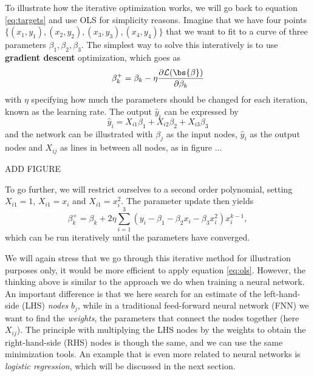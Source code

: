 To illustrate how the iterative optimization works, we will go back to equation \eqref{eq:targets} and use OLS for simplicity reasons. Imagine that we have four points $\{(x_1,y_1),(x_2,y_2),(x_3,y_3),(x_4,y_4)\}$ that we want to fit to a curve of three parameters $\beta_1,\beta_2,\beta_3$. The simplest way to solve this interatively is to use \textbf{gradient descent} optimization, which goes as
\begin{equation}
\beta_k^+=\beta_k-\eta \frac{\partial\mathcal{L}(\bs{\beta})}{\partial\beta_k}
\end{equation}
with $\eta$ specifying how much the parameters should be changed for each iteration, known as the learning rate. 
The output $\hat{y}_i$ can be expressed by
\begin{equation}
\hat{y}_i=X_{i1}\beta_1+X_{i2}\beta_2+X_{i3}\beta_3
\end{equation}
and the network can be illustrated with $\beta_j$ as the input nodes, $\hat{y}_i$ as the output nodes and $X_{ij}$ as lines in between all nodes, as in figure ... 

ADD FIGURE

To go further, we will restrict  ourselves to a second order polynomial, setting $X_{i1}=1$, $X_{i1}=x_i$ and $X_{i1}=x_i^2$. The parameter update then yields
\begin{equation}
\beta_k^+=\beta_k+2\eta\sum_{i=1}^3(y_i-\beta_1-\beta_2x_i-\beta_3x_i^2)x_i^{k-1},
\end{equation}
which can be run iteratively until the parameters have converged. 

We will again stress that we go through this iterative method for illustration purposes only, it would be more efficient to apply equation \eqref{eq:ols}. However, the thinking above is similar to the approach we do when training a neural network. An important difference is that we here search for an estimate of the left-hand-side (LHS) \textit{nodes} $b_j$, while in a traditional feed-forward neural network (FNN) we want to find the \textit{weights}, the parameters that connect the nodes together (here $X_{ij}$). The principle with multiplying the LHS nodes by the weights to obtain the right-hand-side (RHS) nodes is though the same, and we can use the same minimization tools. An example that is even more related to neural networks is \textit{logistic regression}, which will be discussed in the next section. 

